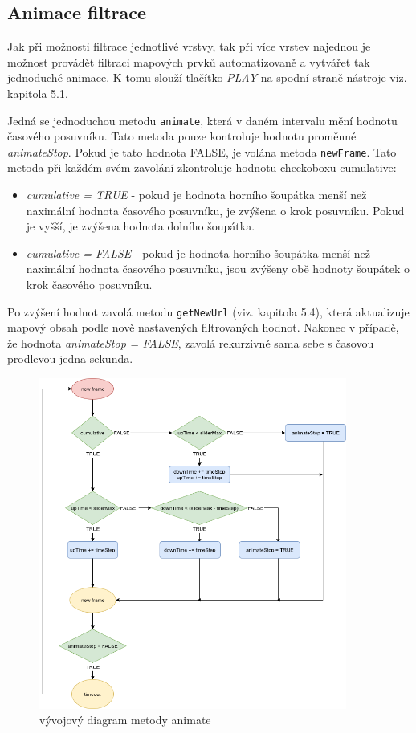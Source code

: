 \subsection{Animace filtrace}

Jak při možnosti filtrace jednotlivé vrstvy, tak při více vrstev
najednou je možnost provádět filtraci mapových prvků automatizovaně a
vytvářet tak jednoduché animace. K tomu slouží tlačítko \textit{PLAY}
na spodní straně nástroje viz. kapitola 5.1.

Jedná se jednoduchou metodu \verb|animate|, která v daném intervalu
mění hodnotu časového posuvníku. Tato metoda pouze kontroluje hodnotu
proměnné \textit{animateStop}. Pokud je tato hodnota FALSE, je volána
metoda \verb|newFrame|. Tato metoda při každém svém zavolání
zkontroluje hodnotu checkoboxu cumulative:
\begin{itemize}
	\item\textit{cumulative = TRUE} - pokud je hodnota horního
	šoupátka menší než naximální hodnota časového posuvníku, je
	zvýšena o krok posuvníku. Pokud je vyšší, je zvýšena hodnota
	dolního šoupátka.
        \item\textit{cumulative = FALSE} - pokud je
	hodnota horního šoupátka menší než naximální hodnota časového
	posuvníku, jsou zvýšeny obě hodnoty šoupátek o krok časového
	posuvníku.
\end{itemize}
Po zvýšení hodnot zavolá metodu \verb|getNewUrl| (viz. kapitola 5.4),
která aktualizuje mapový obsah podle nově nastavených filtrovaných
hodnot. Nakonec v případě, že hodnota \textit{animateStop = FALSE},
zavolá rekurzivně sama sebe s časovou prodlevou jedna sekunda.

\begin{figure}[h!]
	\centering \includegraphics[width=0.9\textwidth]{../img/animate.png} \caption{vývojový
	diagram metody animate} \label{fig:animate-chart}
\end{figure}
